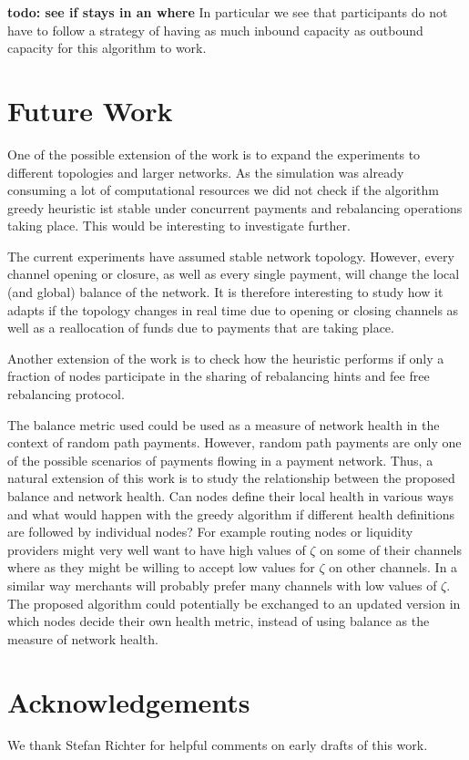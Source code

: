 \documentclass[a4paper]{paper}
\begin{document}
\textbf{todo: see if stays in an where}
In particular we see that participants do not have to follow a strategy of having as much inbound capacity as outbound capacity for this algorithm to work. 
\section{Future Work}
\label{sec:future}

One of the possible extension of the work is to expand the experiments to different topologies and larger networks.
As the simulation was already consuming a lot of computational resources we did not check if the algorithm greedy heuristic ist stable under concurrent payments and rebalancing operations taking place. 
This would be interesting to investigate further.

The current experiments have assumed stable network topology. 
However, every channel opening or closure, as well as every single payment, will change the local (and global) balance of the network.
It is therefore interesting to study how it adapts if the topology changes in real time due to opening or closing channels as well as a reallocation of funds due to payments that are taking place. 

Another extension of the work is to check how the heuristic performs if only a fraction of nodes participate in the sharing of rebalancing hints and fee free rebalancing protocol.

The balance metric used could be used as a measure of network health in the context of random path payments. 
However, random path payments are only one of the possible scenarios of payments flowing in a payment network. 
Thus, a natural extension of this work is to 
study the relationship between the proposed balance and network health. Can nodes define their local health in various ways and what would happen with the greedy algorithm if different health definitions are followed by individual nodes?
For example routing nodes or liquidity providers might very well want to have high values of $\zeta$ on some of their channels where as they might be willing to accept low values for $\zeta$ on other channels.
In a similar way merchants will probably prefer many channels with low values of $\zeta$.
The proposed algorithm could potentially be exchanged to an updated version in which nodes decide their own health metric,
instead of using balance as the measure of network health.


\section{Acknowledgements}
\label{sec:ack}
We thank Stefan Richter for helpful comments on early drafts of this work.




\end{document}
